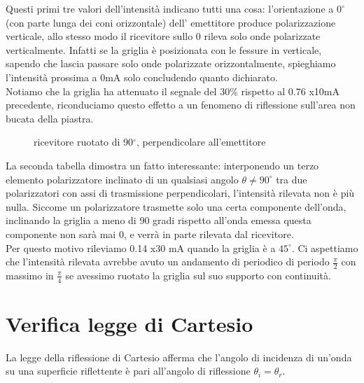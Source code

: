 \documentclass{article}
\theoremstyle{definition}
\begin{document}
\noindent Questi primi tre valori dell'intensità indicano tutti una cosa: l'orientazione a \(0^{\circ}\) (con parte lunga dei coni orizzontale) dell' emettitore produce polarizzazione verticale, allo stesso modo il ricevitore sullo 0 rileva solo onde polarizzate verticalmente. Infatti se la griglia è posizionata con le fessure in verticale, sapendo che lascia passare solo onde polarizzate orizzontalmente, spieghiamo l'intensità prossima a 0mA solo concludendo quanto dichiarato.\\
Notiamo che la griglia ha attenuato il segnale del 30\% rispetto al 0.76 x10mA precedente, riconduciamo questo effetto a un fenomeno di riflessione sull'area non bucata della piastra.

\begin{figure}[!htbp]
    	\captionsetup{labelformat=empty}
        \caption{ricevitore ruotato di 90\(^{\circ}\), perpendicolare all'emettitore}
    	
\end{figure}

\noindent La seconda tabella dimostra un fatto interessante: interponendo un terzo elemento polarizzatore inclinato di un qualsiasi angolo \(\theta \neq  90^{\circ}\) tra due polarizzatori con assi di trasmissione perpendicolari, l'intensità rilevata non è più nulla. Siccome un polarizzatore trasmette solo una certa componente dell'onda, inclinando la griglia a meno di 90 gradi rispetto all'onda emessa questa componente non sarà mai 0, e verrà in parte rilevata dal ricevitore.\\
\noindent Per questo motivo rileviamo 0.14 x30 mA quando la griglia è a \(45^{\circ}\). Ci aspettiamo che l'intensità rilevata avrebbe avuto un andamento di periodico di periodo \(\frac{\pi}{2}\) con massimo in \(\frac{\pi}{4}\) se avessimo ruotato la griglia sul suo supporto con continuità.


\section{Verifica legge di Cartesio}%
La legge della riflessione di Cartesio afferma che l'angolo di incidenza di un'onda su una superficie riflettente è pari all'angolo di riflessione
$\theta_i = \theta_r$.
\end{document}
